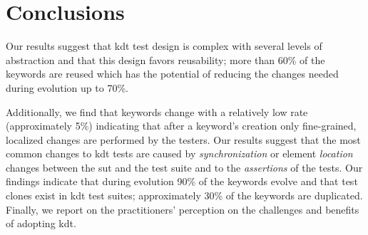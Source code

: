 \section{Conclusions}

Our results suggest that \gls{kdt} test design is complex with several levels of abstraction and that this design favors reusability; more than 60\% of the keywords are reused which has the potential of reducing the changes needed during evolution up to 70\%.

Additionally, we find that keywords change with a relatively low rate (approximately 5\%) indicating that after a keyword's creation only fine-grained, localized changes are performed by the testers. Our results suggest that the most common changes to \gls{kdt} tests are caused by \emph{synchronization} or element \emph{location} changes between the \gls{sut} and the test suite and to the \emph{assertions} of the tests. Our findings indicate that during evolution 90\% of the keywords evolve and that test clones exist in \gls{kdt} test suites; approximately 30\% of the keywords are duplicated. Finally, we report on the practitioners' perception on the challenges and benefits of adopting \gls{kdt}.